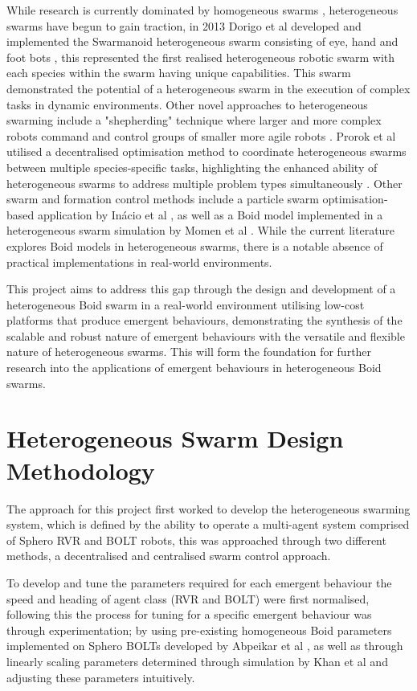 \documentclass[conference]{IEEEtran}
\begin{document}
While research is currently dominated by homogeneous swarms \cite{brambilla_swarm_2013}, heterogeneous swarms have begun to gain traction, in 2013 Dorigo et al developed and implemented the Swarmanoid heterogeneous swarm consisting of eye, hand and foot bots \cite{dorigo_swarmanoid_2013}, this represented the first realised heterogeneous robotic swarm with each species within the swarm having unique capabilities. This swarm demonstrated the potential of a heterogeneous swarm in the execution of complex tasks in dynamic environments. Other novel approaches to heterogeneous swarming include a "shepherding" technique where larger and more complex robots command and control groups of smaller more agile robots \cite{pinciroli_coordinating_2010}. Prorok et al utilised a decentralised optimisation method to coordinate heterogeneous swarms between multiple species-specific tasks, highlighting the enhanced ability of heterogeneous swarms to address multiple problem types simultaneously \cite{prorok_impact_2017}. Other swarm and formation control methods include a particle swarm optimisation-based application by Inácio et al \cite{inacio_pso-based_2019}, as well as a Boid model implemented in a heterogeneous swarm simulation by Momen et al \cite{momen_mixed_2007}. While the current literature explores Boid models in heterogeneous swarms, there is a notable absence of practical implementations in real-world environments.

This project aims to address this gap through the design and development of a heterogeneous Boid swarm in a real-world environment utilising low-cost platforms that produce emergent behaviours, demonstrating the synthesis of the scalable and robust nature of emergent behaviours with the versatile and flexible nature of heterogeneous swarms. This will form the foundation for further research into the applications of emergent behaviours in heterogeneous Boid swarms. 

\section{Heterogeneous Swarm Design Methodology}

The approach for this project first worked to develop the heterogeneous swarming system, which is defined by the ability to operate a multi-agent system comprised of Sphero RVR and BOLT robots, this was approached through two different methods, a decentralised and centralised swarm control approach.  

To develop and tune the parameters required for each emergent behaviour the speed and heading of agent class (RVR and BOLT) were first normalised, following this the process for tuning for a specific emergent behaviour was through experimentation; by using pre-existing homogeneous Boid parameters implemented on Sphero BOLTs developed by Abpeikar et al \cite{abpeikar_mechanism_2023}, as well as through linearly scaling parameters determined through simulation by Khan et al \cite{khan_autonomous_2020} and adjusting these parameters intuitively. 
\end{document}
